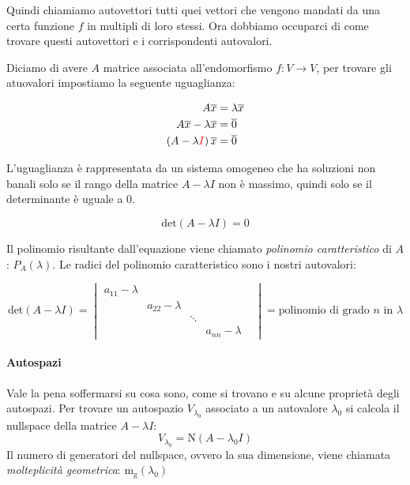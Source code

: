 \documentclass[x11names]{article}
\begin{document}
Quindi chiamiamo autovettori tutti quei vettori che vengono mandati da una certa funzione $f$ in multipli di loro stessi. Ora dobbiamo occuparci di come trovare questi autovettori e i corrispondenti autovalori. 

\noindent
Diciamo di avere $A$ matrice associata all'endomorfismo  $f:V \rightarrow V$, per trovare gli atuovalori impostiamo la seguente uguaglianza: 

\begin{align*}
A\overline{x} &= \lambda \overline{x} \\
A\overline{x} - \lambda \overline{x} &= \overline{0}\\
\left(A - \lambda \textcolor{red}{I}\right)\overline{x} &= \overline{0} 
\end{align*}

L'uguaglianza è rappresentata da un sistema omogeneo che ha soluzioni non banali solo se il rango della matrice $A-\lambda I$ non è massimo, quindi solo se il determinante è uguale a $0$.

\[
\text{det}\left(A - \lambda I\right) = 0
\] 

\noindent
Il polinomio risultante dall'equazione viene chiamato \textit{polinomio caratteristico} di $A$:  $P_{A}\left(\lambda\right)$. Le radici del polinomio caratteristico sono i nostri autovalori:

 \[
\text{det}\left(A-\lambda I\right) = \begin{vmatrix}
     a_{11}-\lambda &  &  & \\
     & a_{22}-\lambda &  & \\
     &  & \ddots&  & \\
     & &  & a_{nn}-\lambda 
\end{vmatrix}
= \text{polinomio di grado }n \text{ in } \lambda
\] 

\paragraph{Autospazi} Vale la pena soffermarsi su cosa sono, come si trovano e su alcune proprietà degli autospazi.
Per trovare un autospazio $V_{\lambda_{0}}$ associato a un autovalore $\lambda_{0}$ si calcola il nullspace della matrice $A-\lambda I$:
 \[
	 V_{\lambda_{0}} = \text{N}\left(A-\lambda_{0} I\right)
\] 
\noindent
Il numero di generatori del nullspace, ovvero la sua dimensione, viene chiamata \textit{molteplicità geometrica}: $\text{m}_{\text{g}}\left(\lambda_{0}\right)$
\end{document}

